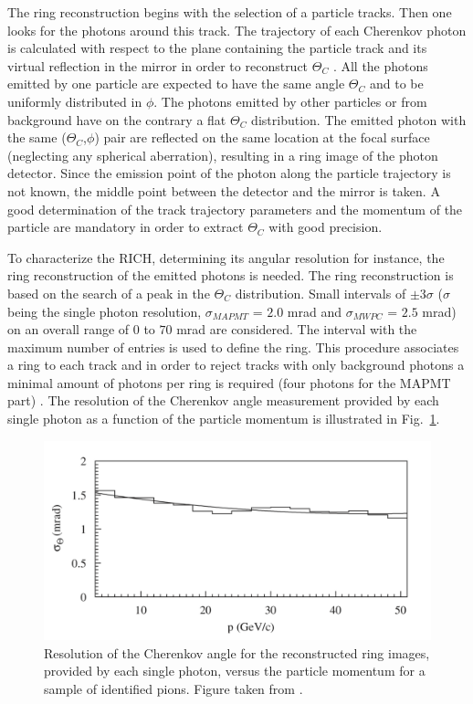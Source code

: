The ring reconstruction begins with the selection of a particle tracks. Then one looks for the photons around this track. The trajectory of each Cherenkov photon is calculated with respect to the plane containing the particle track and its virtual reflection in the mirror in order to reconstruct $\Theta_C$ \cite{RICHTheory}. All the photons emitted by one particle are expected to have the same angle $\Theta_C$ and to be uniformly distributed in $\phi$. The photons emitted by other particles or from background have on the contrary a flat $\Theta_C$ distribution. The emitted photon with the same ($\Theta_C$,$\phi$) pair are reflected on the same location at the focal surface (neglecting any spherical aberration), resulting in a ring image of the photon detector. Since the emission point of the photon along the particle trajectory is not known, the middle point between the detector and the mirror is taken. A good determination of the track trajectory parameters and the momentum of the particle are mandatory in order to extract $\Theta_C$ with good precision.

To characterize the RICH, determining its angular resolution for instance, the ring reconstruction of the emitted photons is needed. The ring reconstruction is based on the search of a peak in the $\Theta_C$ distribution. Small intervals of $\pm$3$\sigma$ ($\sigma$ being the single photon resolution, $\sigma_{MAPMT}$ = $2.0$ mrad and $\sigma_{MWPC}$ = $2.5$ mrad) on an overall range of $0$ to $70$ mrad are considered. The interval with the maximum number of entries is used to define the ring. This procedure associates a ring to each track and in order to reject tracks with only background photons a minimal amount of photons per ring is required (four photons for the MAPMT part) \cite{RICHPID}. The resolution of the Cherenkov angle measurement provided by each single photon as a function of the particle momentum is illustrated in Fig.~\ref{pic:RICHRez}.

\begin{figure}[!h]
  \centering
	\includegraphics[scale=0.5]{./gfx/RICHRez.png}
	\caption{Resolution of the Cherenkov angle for the reconstructed ring images, provided by each single photon, versus the particle momentum for a sample of identified pions. Figure taken from \cite{NIM}.}
	\label{pic:RICHRez}
\end{figure}

